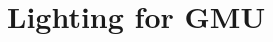 \documentclass[../../main]{subfiles}
\begin{document}
\section{Lighting for GMU} \label{sec:}
\end{document}
